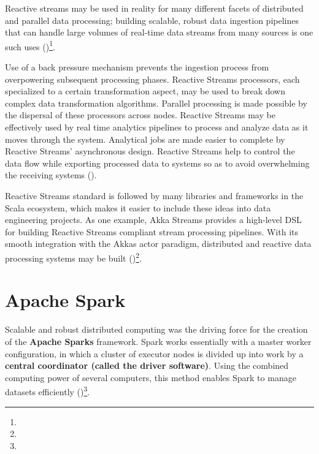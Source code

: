Reactive streams may be used in reality for many different facets of distributed and parallel data processing; building scalable, robust data ingestion pipelines that can handle large volumes of real-time data streams from many sources is one such uses (\cite{kuhnReactiveDesignPatterns2017})\footnote[33]{}.

Use of a back pressure mechanism prevents the ingestion process from overpowering subsequent processing phases. Reactive Streams processors, each specialized to a certain transformation aspect, may be used to break down complex data transformation algorithms. Parallel processing is made possible by the dispersal of these processors across nodes. Reactive Streams may be effectively used by real time analytics pipelines to process and analyze data as it moves through the system. Analytical jobs are made easier to complete by Reactive Streams' asynchronous design. Reactive Streams help to control the data flow while exporting processed data to systems so as to avoid overwhelming the receiving systems (\cite{kuhnReactiveDesignPatterns2017})\footnotemark[33].

Reactive Streams standard is followed by many libraries and frameworks in the Scala ecosystem, which makes it easier to include these ideas into data engineering projects. As one example, Akka Streams provides a high-level DSL for building Reactive Streams compliant stream processing pipelines. With its smooth integration with the Akkas actor paradigm, distributed and reactive data processing systems may be built (\cite{kuhnReactiveDesignPatterns2017})\footnote[33]{}.











\section{Apache Spark}

Scalable and robust distributed computing was the driving force for the creation of the \textbf{Apache Sparks} framework. Spark works essentially with a master worker configuration, in which a cluster of executor nodes is divided up into work by a \textbf{central coordinator (called the driver software)}. Using the combined computing power of several computers, this method enables Spark to manage datasets efficiently (\cite{Kona2023LeveragingSA})\footnote[16]{}.


